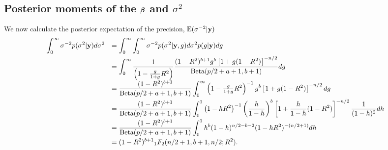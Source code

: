 \subsection{Posterior moments of the $\vbeta$ and $\sigma^2$}
We now calculate the posterior expectation of the precision, $\bE(\sigma^{-2}|\vy)$
$$
\begin{array}{rl}
	\ds \int_0^\infty \sigma^{-2} p(\sigma^2|\vy) d\sigma^2 
	  & \ds = \int_0^\infty \int_0^\infty \sigma^{-2} p(\sigma^2|\vy,g) d\sigma^2 p(g|\vy) dg 
	\\ [2ex]
	  & \ds =  \int_0^\infty \frac{1}{\left(                                                  
	1 -
	\tfrac{g}{1+g} R^2\right)} \frac{(1 -  R^2)^{b+1} g^{b} \left[  1 + g(1 -  R^2) \right]^{-n/2}}{\mbox{Beta}(p/2 + a + 1,b+1)} dg
	\\ [2ex]
	  & \ds =  \frac{(1 -  R^2)^{b+1}}{\mbox{Beta}(p/2 + a + 1,b+1)}                          
	\int_0^\infty \left( 
	1 -
	\tfrac{g}{1+g} R^2\right)^{-1} g^{b} \left[  1 + g(1 -  R^2) \right]^{-n/2}dg
	\\ [2ex]
	  & \ds =  \frac{(1 -  R^2)^{b+1}}{\mbox{Beta}(p/2 + a + 1,b+1)}                          
	\int_0^1 \left( 
	1 -
	h R^2\right)^{-1} \left( \frac{h}{1 - h}\right)^{b} \left[  1 + \frac{h}{1 - h}(1 -  R^2) \right]^{-n/2} \frac{1}{(1 - h)^2} dh
	
	
	\\ [2ex]
	    
	  & \ds =  \frac{(1 -  R^2)^{b+1}}{\mbox{Beta}(p/2 + a + 1,b+1)}                          
	\int_0^1  h^b (1 - h)^{n/2 - b - 2} ( 1 -  hR^2)^{-(n/2+1)}  dh
	    
	    
	\\ [2ex]
	  & \ds =  (1 -  R^2)^{b+1}                                                               
	{}_1 F_2(n/2+1,b+1,n/2;R^2)  .
\end{array}
$$






